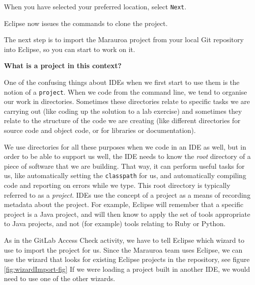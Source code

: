 \documentclass[
]{book}
\begin{document}
When you have selected your preferred location, select \texttt{Next}.

Eclipse now issues the commands to clone the project.

The next step is to import the Marauroa project from your local Git repository into Eclipse, so you can start to work on it.

\textbf{What is a project in this context?}

One of the confusing things about IDEs when we first start to use them is the notion of a \texttt{project}. When we code from the command line, we tend to organise our work in directories. Sometimes these directories relate to specific tasks we are carrying out (like coding up the solution to a lab exercise) and sometimes they relate to the structure of the code we are creating (like different directories for source code and object code, or for libraries or documentation).

We use directories for all these purposes when we code in an IDE as well, but in order to be able to support us well, the IDE needs to know the \emph{root} directory of a piece of software that we are building. That way, it can perform useful tasks for us, like automatically setting the \texttt{classpath} for us, and automatically compiling code and reporting on errors while we type. This root directory is typically referred to as a \emph{project}. IDEs use the concept of a project as a means of recording metadata about the project. For example, Eclipse will remember that a specific project is a Java project, and will then know to apply the set of tools appropriate to Java projects, and not (for example) tools relating to Ruby or Python.

As in the GitLab Access Check activity, we have to tell Eclipse which wizard to use to import the project for us. Since the Marauroa team uses Eclipse, we can use the wizard that looks for existing Eclipse projects in the repository, see figure \ref{fig:wizardImport-fig} If we were loading a project built in another IDE, we would need to use one of the other wizards.
\end{document}
